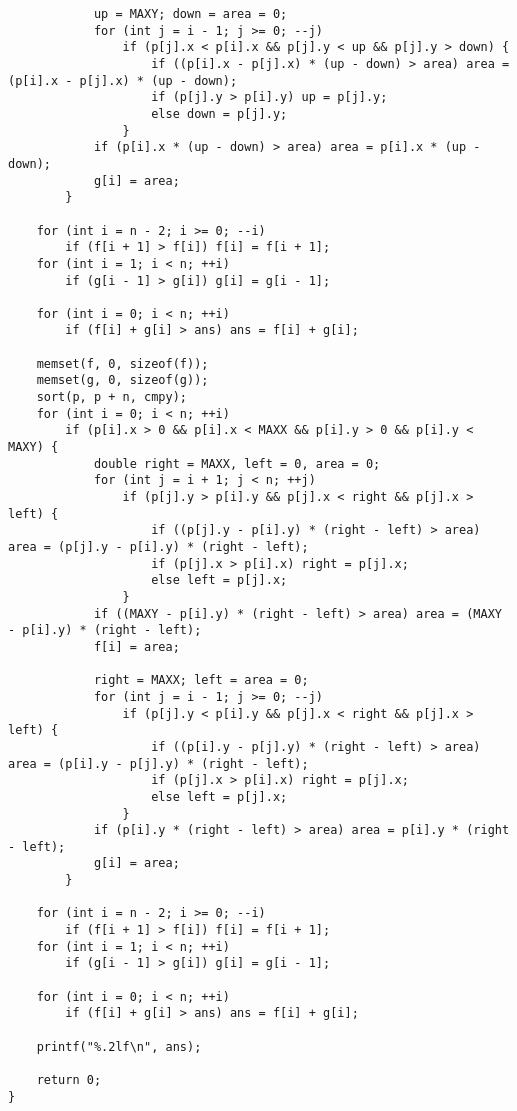 \begin{verbatim}
            up = MAXY; down = area = 0;
            for (int j = i - 1; j >= 0; --j)
                if (p[j].x < p[i].x && p[j].y < up && p[j].y > down) {
                    if ((p[i].x - p[j].x) * (up - down) > area) area = (p[i].x - p[j].x) * (up - down);
                    if (p[j].y > p[i].y) up = p[j].y;
                    else down = p[j].y;
                }
            if (p[i].x * (up - down) > area) area = p[i].x * (up - down);
            g[i] = area;
        }

    for (int i = n - 2; i >= 0; --i)
        if (f[i + 1] > f[i]) f[i] = f[i + 1];
    for (int i = 1; i < n; ++i)
        if (g[i - 1] > g[i]) g[i] = g[i - 1];

    for (int i = 0; i < n; ++i)
        if (f[i] + g[i] > ans) ans = f[i] + g[i];

    memset(f, 0, sizeof(f));
    memset(g, 0, sizeof(g));
    sort(p, p + n, cmpy);
    for (int i = 0; i < n; ++i)
        if (p[i].x > 0 && p[i].x < MAXX && p[i].y > 0 && p[i].y < MAXY) {
            double right = MAXX, left = 0, area = 0;
            for (int j = i + 1; j < n; ++j)
                if (p[j].y > p[i].y && p[j].x < right && p[j].x > left) {
                    if ((p[j].y - p[i].y) * (right - left) > area) area = (p[j].y - p[i].y) * (right - left);
                    if (p[j].x > p[i].x) right = p[j].x;
                    else left = p[j].x;
                }
            if ((MAXY - p[i].y) * (right - left) > area) area = (MAXY - p[i].y) * (right - left);
            f[i] = area;

            right = MAXX; left = area = 0;
            for (int j = i - 1; j >= 0; --j)
                if (p[j].y < p[i].y && p[j].x < right && p[j].x > left) {
                    if ((p[i].y - p[j].y) * (right - left) > area) area = (p[i].y - p[j].y) * (right - left);
                    if (p[j].x > p[i].x) right = p[j].x;
                    else left = p[j].x;
                }
            if (p[i].y * (right - left) > area) area = p[i].y * (right - left);
            g[i] = area;
        }

    for (int i = n - 2; i >= 0; --i)
        if (f[i + 1] > f[i]) f[i] = f[i + 1];
    for (int i = 1; i < n; ++i)
        if (g[i - 1] > g[i]) g[i] = g[i - 1];

    for (int i = 0; i < n; ++i)
        if (f[i] + g[i] > ans) ans = f[i] + g[i];

    printf("%.2lf\n", ans);

    return 0;
}
\end{verbatim}
